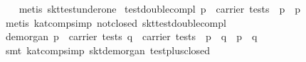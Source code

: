 \begin{isabellebody}
%
\isadelimproof
\ \ %
\endisadelimproof
%
\isatagproof
{}\isamarkupfalse%
\ {}metis\ skt{}test{}under{}one{}%
\endisatagproof
{\isafoldproof}%
%
\isadelimproof
\isanewline
%
\endisadelimproof
\isanewline
{}\isamarkupfalse%
\ test{}double{}compl{}\ {}p\ {}\ carrier\ tests\ {}\ p\ {}\ {}{}{}p{}{}\isanewline
%
\isadelimproof
\ \ %
\endisadelimproof
%
\isatagproof
{}\isamarkupfalse%
\ {}metis\ kat{}comp{}simp\ not{}closed\ skt{}test{}double{}compl{}%
\endisatagproof
{\isafoldproof}%
%
\isadelimproof
\isanewline
%
\endisadelimproof
\isanewline
{}\isamarkupfalse%
\ de{}morgan{}{}\ {}{}p\ {}\ carrier\ tests{}\ q\ {}\ carrier\ tests{}\ {}\ {}p\ {}\ {}q\ {}\ {}{}p\ {}\ q{}{}\isanewline
%
\isadelimproof
\ \ %
\endisadelimproof
%
\isatagproof
{}\isamarkupfalse%
\ {}smt\ kat{}comp{}simp\ skt{}de{}morgan{}\ test{}plus{}closed{}%

\end{isabellebody}
